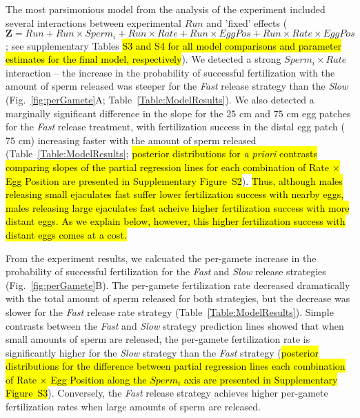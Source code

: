 \documentclass{article}
\begin{document}
	The most parsimonious model from the analysis of the  experiment included several interactions between experimental $Run$ and 'fixed' effects ($\mathbf{Z} = Run + Run \times Sperm_i + Run \times Rate + Run \times EggPos + Run \times Rate \times EggPos$; see supplementary Tables \hl{S3 and S4 for all model comparisons and parameter estimates for the final model, respectively}). We detected a strong $Sperm_i \times Rate$ interaction -- the increase in the probability of successful fertilization with the amount of sperm released was steeper for the \textit{Fast} release strategy than the \textit{Slow} (Fig.~\ref{fig:perGamete}A; Table~\ref{Table:ModelResults}). We also detected a marginally significant difference in the slope for the $25$ cm and $75$ cm egg patches for the \textit{Fast} release treatment, with fertilization success in the distal egg patch ($75$ cm) increasing faster with the amount of sperm released (Table~\ref{Table:ModelResults}; \hl{posterior distributions for \textit{a priori} contrasts comparing slopes of the partial regression lines for each combination of Rate $\times$ Egg Position are presented in Supplementary Figure~S2}). \hl{Thus, although males releasing small ejaculates fast suffer lower fertilization success with nearby eggs, males releasing large ejaculates fast acheive higher fertilization success with more distant eggs. As we explain below, however, this higher fertilization success with distant eggs comes at a cost.}

	From the  experiment results, we calcuated the per-gamete increase in the probability of successful fertilization for the \textit{Fast} and \textit{Slow} release strategies (Fig.~\ref{fig:perGamete}B). The per-gamete fertilization rate decreased dramatically with the total amount of sperm released for both strategies, but the decrease was slower for the \textit{Fast} release rate strategy (Table~\ref{Table:ModelResults}). Simple contrasts between the \textit{Fast} and \textit{Slow} strategy prediction lines showed that when small amounts of sperm are released, the per-gamete fertilization rate is significantly higher for the \textit{Slow} strategy than the \textit{Fast} strategy (\hl{posterior distributions for the difference between partial regression lines each combination of Rate $\times$ Egg Position along the $Sperm_i$ axis are presented in Supplementary Figure~S3}). Conversely, the \textit{Fast} release strategy achieves higher per-gamete fertilization rates when large amounts of sperm are released.
\end{document}

